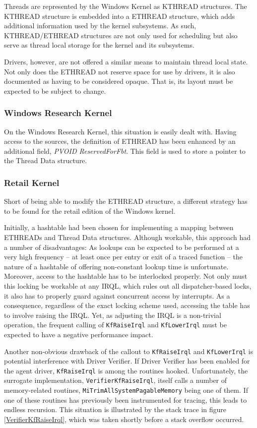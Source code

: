 Threads are represented by the Windows Kernel as KTHREAD structures. The 
KTHREAD structure is embedded into a ETHREAD structure, which adds additional
information used by the kernel subsystems. As such, KTHREAD/ETHREAD structures
are not only used for scheduling but also serve as thread local storage for the
kernel and its subsystems.

Drivers, however, are not offered a similar means to maintain thread local state.
Not only does the ETHREAD not reserve space for use by drivers, it is also
documented as having to be considered opaque. That is, its layout must be expected
to be subject to change.

\subsubsection{Windows Research Kernel}
On the Windows Research Kernel, this situation is easily dealt with. Having
access to the sources, the definition of ETHREAD has been enhanced by an 
additional field, \emph{PVOID ReservedForFbt}. This field is used to store
a pointer to the Thread Data structure.

\subsubsection{Retail Kernel}
Short of being able to modify the ETHREAD structure, a different strategy has
to be found for the retail edition of the Windows kernel.

Initially, a hashtable had been chosen for implementing a mapping between 
ETHREADs and Thread Data structures. Although workable, this approach had a 
number of disadvantages: As lookups can be expected to be performed
at a very high frequency -- at least once per entry or exit of a traced function --
the nature of a hashtable of offering non-constant lookup time is unfortunate.
Moreover, access to the hashtable has to be interlocked properly. Not only
must this locking be workable at any IRQL, which rules out all dispatcher-based
locks, it also has to properly guard against concurrent access by interrupts.
As a consequence, regardless of the exact locking scheme used, accessing the table
has to involve raising the IRQL. Yet, as adjusting the IRQL is a non-trivial operation,
the frequent calling of \verb|KfRaiseIrql| and \verb|KfLowerIrql| must be expected
to have a negative performance impact.

Another non-obvious drawback of the callout to \verb|KfRaiseIrql| and \verb|KfLowerIrql|
is potential interference with Driver Verifier. If Driver Verifier has been enabled for
the agent driver, \verb|KfRaiseIrql| is among the routines hooked. Unfortunately,
the surrogate implementation, \verb|VerifierKfRaiseIrql|, itself calls a number
of memory-related routines, \verb|MiTrimAllSystemPagableMemory| being one of them. If one
of these routines has previously been instrumented for tracing, this leads to endless
recursion. This situation is illustrated by the stack trace in figure 
\ref{VerifierKfRaiseIrql}, which was taken shortly before a stack overflow occurred.

